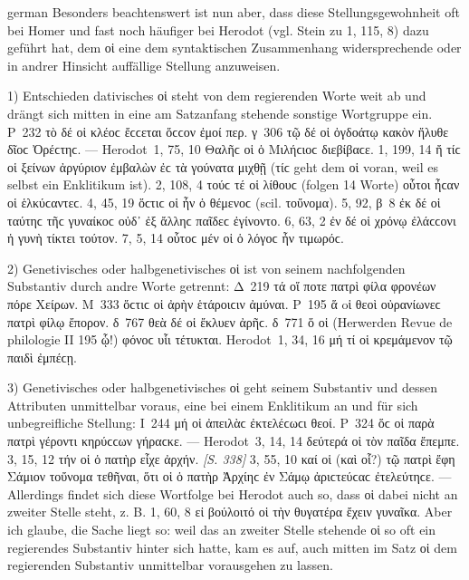 \begin{otherlanguage*}{german}
Besonders beachtenswert ist nun aber, dass diese Stellungsgewohnheit oft bei Homer und fast noch häufiger bei Herodot (vgl. Stein zu 1, 115, 8) dazu geführt hat, dem οἱ eine dem syntaktischen Zusammenhang widersprechende oder in andrer Hinsicht auffällige Stellung anzuweisen.

1)	Entschieden dativisches οἱ steht von dem regierenden Worte weit ab und drängt sich mitten in eine am Satzanfang stehende sonstige Wortgruppe ein. Ρ~232 τὸ δέ οἱ κλέοϲ ἔϲϲεται ὅϲϲον ἐμοί περ. γ~306 τῷ δέ οἱ ὀγδοάτῳ κακὸν ἤλυθε δῖοϲ Ὀρέϲτηϲ. — Herodot~1, 75, 10 Θαλῆϲ οἱ ὁ Μιλήϲιοϲ διεβίβαϲε. 1, 199, 14 ἤ τίϲ οἱ ξείνων ἀργύριον ἐμβαλὼν ἐϲ τὰ γούνατα μιχθῇ (τίϲ geht dem οἱ voran, weil es selbst ein Enklitikum ist). 2, 108, 4 τούϲ τέ οἱ λίθουϲ (folgen 14 Worte) οὗτοι ἦϲαν οἱ ἑλκύϲαντεϲ. 4, 45, 19 ὅϲτιϲ οἱ ἦν ὁ θέμενοϲ (scil. τοὔνομα). 5, 92, β~8 ἐκ δέ οἱ ταύτηϲ τῆϲ γυναίκοϲ οὐδ᾽ ἐξ ἄλληϲ παῖδεϲ ἐγίνοντο. 6, 63, 2 ἐν δέ οἱ χρόνῳ ἐλάϲϲονι ἡ γυνὴ τίκτει τούτον. 7, 5, 14 οὗτοϲ μέν οἱ ὁ λόγοϲ ἦν τιμωρόϲ.

2)	Genetivisches oder halbgenetivisches οἱ ist von seinem nachfolgenden Substantiv durch andre Worte getrennt: Δ~219 τά οἵ ποτε πατρὶ φίλα φρονέων πόρε Χείρων. Μ~333 ὅϲτιϲ οἱ ἀρὴν ἑτάροιϲιν ἀμύναι. Ρ~195 ἅ oἱ θεοὶ οὐρανίωνεϲ πατρὶ φίλῳ ἔπορον. δ~767 θεὰ δέ οἱ ἔκλυεν ἀρῆϲ. δ~771 ὅ οἱ (Herwerden Revue de philologie II 195 ᾧ!) φόνοϲ υἷι τέτυκται. Herodot~1, 34, 16 μή τί οἱ κρεμάμενον τῷ παιδὶ ἐμπέϲῃ.

3)	Genetivisches oder halbgenetivisches οἱ geht seinem Substantiv und dessen Attributen unmittelbar voraus, eine bei einem Enklitikum an und für sich unbegreifliche Stellung: Ι~244 μή οἱ ἀπειλὰϲ ἐκτελέϲωϲι θεοί. Ρ~324 ὅϲ οἱ παρὰ πατρὶ γέροντι κηρύϲϲων γήραϲκε. — Herodot~3, 14, 14 δεύτερά οἱ τὸν παῖδα ἔπεμπε. 3, 15, 12 τήν οἱ ὁ πατὴρ εἶχε ἀρχήν. \hypertarget{p338}{\emph{[S. 338]}}\label{p338} 3, 55, 10 καί οἱ (καὶ οἷ?) τῷ πατρὶ ἔφη Σάμιον τοὔνομα τεθῆναι, ὅτι οἱ ὁ πατὴρ Ἀρχίηϲ ἐν Σάμῳ ἀριϲτεύϲαϲ ἐτελεύτηϲε. — Allerdings findet sich diese Wortfolge bei Herodot auch so, dass οἱ dabei nicht an zweiter Stelle steht, z. B. 1, 60, 8 εἰ βούλοιτό οἱ τὴν θυγατέρα ἔχειν γυναῖκα. Aber ich glaube, die Sache liegt so: weil das an zweiter Stelle stehende οἱ so oft ein regierendes Substantiv hinter sich hatte, kam es auf, auch mitten im Satz οἱ dem regierenden Substantiv unmittelbar vorausgehen zu lassen.


\end{otherlanguage*}
